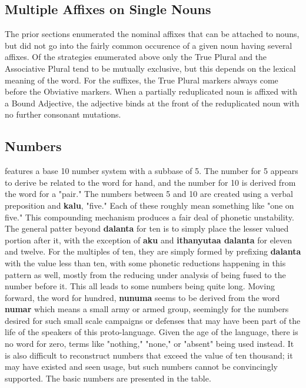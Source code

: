   \subsection{Multiple Affixes on Single Nouns}
  The prior sections enumerated the nominal affixes that can be attached to nouns, but did not go into the fairly common occurence of a given noun having several affixes. Of the strategies enumerated above only the True Plural and the Associative Plural tend to be mutually exclusive, but this depends on the lexical meaning of the word. For the suffixes, the True Plural markers always come before the Obviative markers. When a partially reduplicated noun is affixed with a Bound Adjective, the adjective binds at the front of the reduplicated noun with no further consonant mutations.
  \vertspace

  \subsection{Numbers}
  \langname features a base 10 number system with a subbase of 5. The number for 5 appears to derive be related to the word for hand, and the number for 10 is derived from the word for a "pair." The numbers between 5 and 10 are created using a verbal preposition and \textbf{kalu}, "five." Each of these roughly mean something like "one on five." This compounding mechanism produces a fair deal of phonetic unstability. The general patter beyond \textbf{dalanta} for ten is to simply place the lesser valued portion after it, with the exception of \textbf{aku\tenbase} and \textbf{ithanyutaa dalanta} for eleven and twelve. For the multiples of ten, they are simply formed by prefixing \textbf{dalanta} with the value less than ten, with some phonetic reductions happening in this pattern as well, mostly from the  reducing under analysis of being fused to the number before it. This all leads to some numbers being quite long. Moving forward, the word for hundred, \textbf{nunuma} seems to be derived from the word \textbf{numar} which means a small army or armed group, seemingly for the numbers desired for such small scale campaigns or defenses that may have been part of the life of the speakers of this proto-language. Given the age of the language, there is no word for zero, terms like "nothing," "none," or "absent" being used instead. It is also difficult to reconstruct numbers that exceed the value of ten thousand; it may have existed and seen usage, but such numbers cannot be convincingly supported. The basic numbers are presented in the table.
  \par\vertspace

